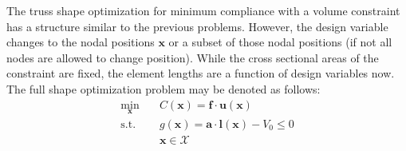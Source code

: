 The truss shape optimization for minimum compliance with a volume constraint has a structure similar to the previous problems. However, the design variable changes to the nodal positions $\mathbf{x}$ or a subset of those nodal positions (if not all nodes are allowed to change position). While the cross sectional areas of the constraint are fixed, the element lengths are a function of design variables now. The full shape optimization problem may be denoted as follows:
\begin{equation}
    \begin{aligned}
        \min_{\mathbf{x}} \quad & C(\mathbf{x}) = \mathbf{f} \cdot \mathbf{u}(\mathbf{x})\\
        \textrm{s.t.} \quad & g(\mathbf{x}) = \mathbf{a} \cdot \mathbf{l}(\mathbf{x}) - V_0 \le 0  \\
                            & \mathbf{x} \in \mathcal{X}\\
    \end{aligned}
    \label{eq:shape_optimization}
\end{equation}

